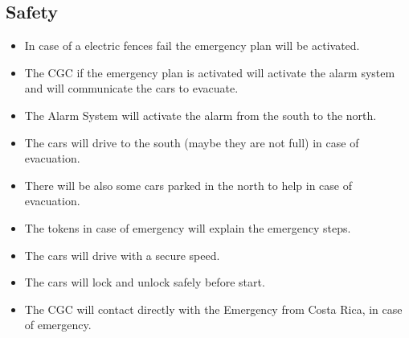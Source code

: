 \documentclass[12pt]{article}
\begin{document}
	\subsection{Safety}
	\begin{itemize}
		\item In case of a electric fences fail the emergency plan will be activated.
		\item The CGC if the emergency plan is activated will activate the alarm system and will communicate the cars to evacuate.
		\item The Alarm System will activate the alarm from the south to the north.
		\item The cars will drive to the south (maybe they are not full) in case of evacuation.
		\item There will be also some cars parked in the north to help in case of evacuation.
		\item The tokens in case of emergency will explain the emergency steps.
		\item The cars will drive with a secure speed.
		\item The cars will lock and unlock safely before start.
		\item The CGC will contact directly with the Emergency from Costa Rica, in case of emergency.
	\end{itemize}
\end{document}
